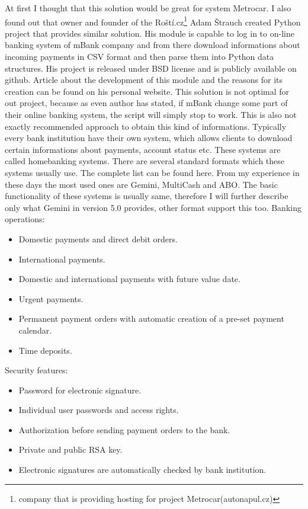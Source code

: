\documentclass[11pt,twoside,a4paper]{book}
\begin{document}
At first I thought that this solution would be great for system Metrocar. I also found out that owner and founder of the Roští.cz\footnote{company that is providing hosting for project Metrocar(autonapul.cz)} Adam Štrauch created Python project that provides similar solution. His module is capable to log in to on-line banking system of mBank company and from there download informations about incoming payments in CSV format and then parse them into Python data structures. His project is released under BSD license and is publicly available on github\cite{python-mbank}. Article about the development of this module and the reasons for its creation can be found on his personal website\cite{mbank}. This solution is not optimal for out project, because as even author has stated, if mBank change some part of their 
online banking system, the script will simply stop to work. This is also not exactly recommended approach to obtain this kind of 
informations. Typically every bank institution have their own system, which allows clients to download certain informations about payments, account status etc. These systems are called homebanking systems. There are several standard formats which 
these systems usually use. The complete list can be found here\cite{hombanking}. From my experience in these days the most used ones are Gemini, MultiCash and ABO. The basic functionality of these systems is usually same, therefore I will further describe only what Gemini in version 5.0 provides, other format support this too. 
Banking operations:
\begin{itemize}
 \item Domestic payments and direct debit orders.
 \item International payments.
 \item Domestic and international payments with future value date.
 \item Urgent payments.
 \item Permanent payment orders with automatic creation of a pre-set payment calendar.
 \item Time deposits.
\end{itemize}

Security features:
\begin{itemize}
	\item Password for electronic signature.
	\item Individual user passwords and access rights.
	\item Authorization before sending payment orders to the bank.
	\item Private and public RSA key.
	\item Electronic signatures are automatically checked by bank institution.
\end{itemize}
\end{document}
